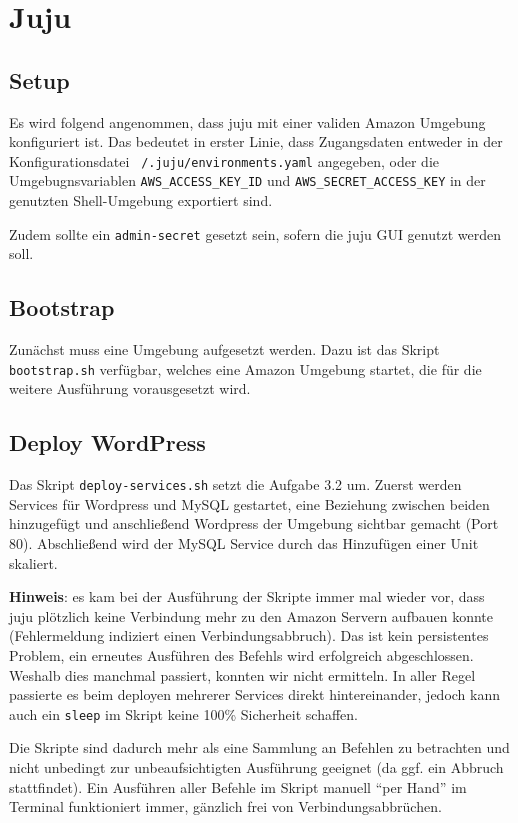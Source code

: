 \section{Juju}
\subsection{Setup}

Es wird folgend angenommen, dass juju mit einer validen Amazon Umgebung konfiguriert ist.
Das bedeutet in erster Linie, dass Zugangsdaten entweder in der Konfigurationsdatei \texttt{~/.juju/environments.yaml} angegeben, oder die Umgebugnsvariablen \texttt{AWS\_ACCESS\_KEY\_ID} und \texttt{AWS\_SECRET\_ACCESS\_KEY} in der genutzten Shell-Umgebung exportiert sind.

Zudem sollte ein \texttt{admin-secret} gesetzt sein, sofern die juju GUI genutzt werden soll.


\subsection{Bootstrap}

Zunächst muss eine Umgebung aufgesetzt werden.
Dazu ist das Skript \texttt{bootstrap.sh} verfügbar, welches eine Amazon Umgebung startet, die für die weitere Ausführung vorausgesetzt wird.


\subsection{Deploy WordPress}

Das Skript \texttt{deploy-services.sh} setzt die Aufgabe 3.2 um.
Zuerst werden Services für Wordpress und MySQL gestartet, eine Beziehung zwischen beiden hinzugefügt und anschließend Wordpress der Umgebung sichtbar gemacht (Port 80).
Abschließend wird der MySQL Service durch das Hinzufügen einer Unit skaliert.

\textbf{Hinweis}: es kam bei der Ausführung der Skripte immer mal wieder vor, dass juju plötzlich keine Verbindung mehr zu den Amazon Servern aufbauen konnte (Fehlermeldung indiziert einen Verbindungsabbruch).
Das ist kein persistentes Problem, ein erneutes Ausführen des Befehls wird erfolgreich abgeschlossen.
Weshalb dies manchmal passiert, konnten wir nicht ermitteln.
In aller Regel passierte es beim deployen mehrerer Services direkt hintereinander, jedoch kann auch ein \texttt{sleep} im Skript keine 100\% Sicherheit schaffen.

Die Skripte sind dadurch mehr als eine Sammlung an Befehlen zu betrachten und nicht unbedingt zur unbeaufsichtigten Ausführung geeignet (da ggf. ein Abbruch stattfindet).
Ein Ausführen aller Befehle im Skript manuell \enquote{per Hand} im Terminal funktioniert immer, gänzlich frei von Verbindungsabbrüchen.



